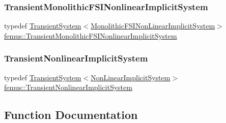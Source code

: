 \mbox{\label{namespacefemus_a2c5863a5e6c0f302d1d26a65da72437d}} 
\subsubsection{\texorpdfstring{Transient\+Monolithic\+F\+S\+I\+Nonlinear\+Implicit\+System}{TransientMonolithicFSINonlinearImplicitSystem}}
{\footnotesize\ttfamily typedef \mbox{\hyperlink{classfemus_1_1_transient_system}{Transient\+System}}$<$\mbox{\hyperlink{classfemus_1_1_monolithic_f_s_i_non_linear_implicit_system}{Monolithic\+F\+S\+I\+Non\+Linear\+Implicit\+System}}$>$ \mbox{\hyperlink{namespacefemus_a2c5863a5e6c0f302d1d26a65da72437d}{femus\+::\+Transient\+Monolithic\+F\+S\+I\+Nonlinear\+Implicit\+System}}}

\mbox{\label{namespacefemus_ac21c0878b82b324aff0b6fe910674efa}} 
\subsubsection{\texorpdfstring{Transient\+Nonlinear\+Implicit\+System}{TransientNonlinearImplicitSystem}}
{\footnotesize\ttfamily typedef \mbox{\hyperlink{classfemus_1_1_transient_system}{Transient\+System}}$<$\mbox{\hyperlink{classfemus_1_1_non_linear_implicit_system}{Non\+Linear\+Implicit\+System}}$>$ \mbox{\hyperlink{namespacefemus_ac21c0878b82b324aff0b6fe910674efa}{femus\+::\+Transient\+Nonlinear\+Implicit\+System}}}



\subsection{Function Documentation}
\mbox{\label{namespacefemus_a7da70cafeeeae70a143195ebc5f991de}} 
